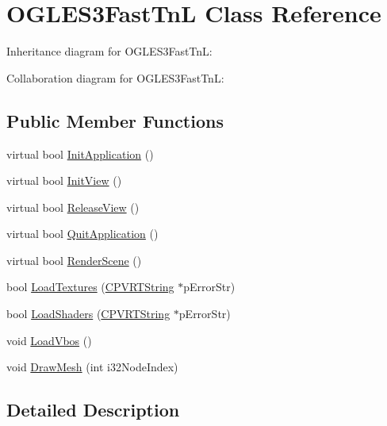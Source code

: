\hypertarget{class_o_g_l_e_s3_fast_tn_l}{\section{O\+G\+L\+E\+S3\+Fast\+Tn\+L Class Reference}
\label{class_o_g_l_e_s3_fast_tn_l}
}


Inheritance diagram for O\+G\+L\+E\+S3\+Fast\+Tn\+L\+:


Collaboration diagram for O\+G\+L\+E\+S3\+Fast\+Tn\+L\+:
\subsection*{Public Member Functions}
\begin{DoxyCompactItemize}
\item 
virtual bool \hyperlink{class_o_g_l_e_s3_fast_tn_l_ac779c1ecf5d537919c7a8fe14a7b7b23}{Init\+Application} ()
\item 
virtual bool \hyperlink{class_o_g_l_e_s3_fast_tn_l_af48f596ece1cc0b42511064a69eb83d5}{Init\+View} ()
\item 
virtual bool \hyperlink{class_o_g_l_e_s3_fast_tn_l_a3413950c7c6449d01ca85aae9b07c714}{Release\+View} ()
\item 
virtual bool \hyperlink{class_o_g_l_e_s3_fast_tn_l_ad53148f2c3e8bc78e096dcefdfc69674}{Quit\+Application} ()
\item 
virtual bool \hyperlink{class_o_g_l_e_s3_fast_tn_l_aff43cb0c6684bf8022ad58c9345a4e60}{Render\+Scene} ()
\item 
bool \hyperlink{class_o_g_l_e_s3_fast_tn_l_a5f009665d1c8c9dc83bc95d97be661fa}{Load\+Textures} (\hyperlink{class_c_p_v_r_t_string}{C\+P\+V\+R\+T\+String} $\ast$p\+Error\+Str)
\item 
bool \hyperlink{class_o_g_l_e_s3_fast_tn_l_a91d641ab61aca8066e9770ece6c8e641}{Load\+Shaders} (\hyperlink{class_c_p_v_r_t_string}{C\+P\+V\+R\+T\+String} $\ast$p\+Error\+Str)
\item 
void \hyperlink{class_o_g_l_e_s3_fast_tn_l_a04fe083493e4c6798fbebc766b5e5166}{Load\+Vbos} ()
\item 
void \hyperlink{class_o_g_l_e_s3_fast_tn_l_a32538c16cc67ddf311d17ead041c31f7}{Draw\+Mesh} (int i32\+Node\+Index)
\end{DoxyCompactItemize}


\subsection{Detailed Description}


